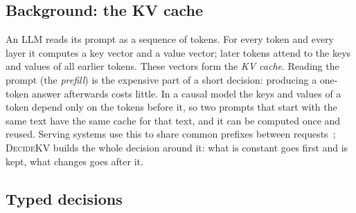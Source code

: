 \documentclass[11pt]{article}
\newcommand{\dkv}{\textsc{DecideKV}}
\begin{document}
\subsection{Background: the KV cache}
An LLM reads its prompt as a sequence of tokens. For every token and every layer it computes a key vector and a value
vector; later tokens attend to the keys and values of all earlier tokens. These vectors form the \emph{KV cache}.
Reading the prompt (the \emph{prefill}) is the expensive part of a short decision: producing a one-token answer
afterwards costs little. In a causal model the keys and values of a token depend only on the tokens before it, so two
prompts that start with the same text have the same cache for that text, and it can be computed once and reused.
Serving systems use this to share common prefixes between requests~\citep{vllm,sglang}; \dkv{} builds the whole
decision around it: what is constant goes first and is kept, what changes goes after it.

\subsection{Typed decisions}
\end{document}
